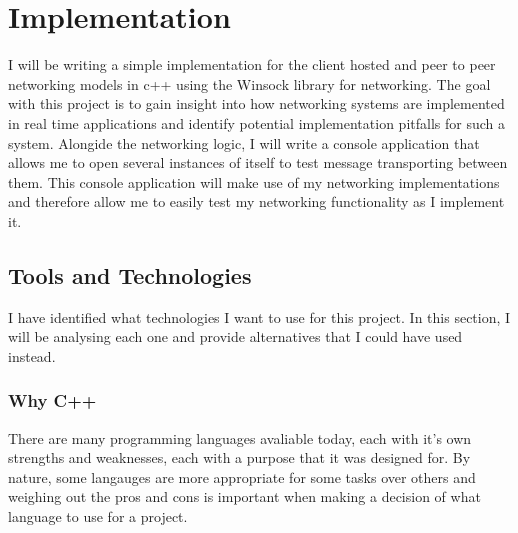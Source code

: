 




\chapter{Implementation}
I will be writing a simple implementation for the client hosted and peer to peer networking models in c++ using the Winsock library for networking. The goal with this project is to gain insight into how networking systems are implemented in real time applications and identify potential implementation pitfalls for such a system. Alongide the networking logic, I will write a console application that allows me to open several instances of itself to test message transporting between them. This console application will make use of my networking implementations and therefore allow me to easily test my networking functionality as I implement it.

\section{Tools and Technologies}
I have identified what technologies I want to use for this project. In this section, I will be analysing each one and provide alternatives that I could have used instead.

\subsection{Why C++}
There are many programming languages avaliable today, each with it's own strengths and weaknesses, each with a purpose that it was designed for. By nature, some langauges are more appropriate for some tasks over others and weighing out the pros and cons is important when making a decision of what language to use for a project.

